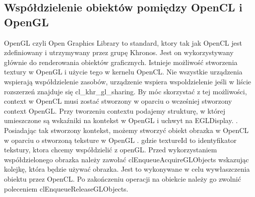 \subsection [Współdzielenie obiektów pomiędzy OpenCL i OpenGL]{Współdzielenie obiektów pomiędzy OpenCL i OpenGL}
OpenGL czyli Open Graphics Library to standard, ktory tak jak OpenCL jest zdefiniowany i utrzymywany przez grupę Khronos. Jest on wykorzystywany głównie do renderowania obiektów graficznych.
Istnieje możliwość stworzenia textury w OpenGL i użycie tego w kernelu OpenCL. Nie wszystkie urządzenia wspierają współdzielenie zasobów, urządzenie wspiera wspoldzielenie jeśli w liście rozszerzeń znajduje się cl\_khr\_gl\_sharing. By móc skorzystać z tej możliwości, context w OpenCL musi zostać stworzony w oparciu o wcześniej stworzony context OpenGL. Przy tworzeniu contextu podajemy strukturę, w której umieszczone są wskaźniki na kontekst w OpenGL i uchwyt na EGLDisplay. 
 .
 Posiadając tak stworzony kontekst, możemy stworzyć obiekt obrazka w OpenCL w oparciu o stworzoną teksture w OpenGL
 . gdzie textureId to identyfikator tekstury, ktora chcemy współdzielić z openGL. 
 Przed wykorzystaniem współdzielonego obrazka należy zawołać clEnqueueAcquireGLObjects wskazując kolejkę, która będzie używać obrazka. Jest to wykonywane w celu wywłaszczenia obiektu przez OpenCL. Po zakończeniu operacji na obiekcie należy go zwolnić poleceniem clEnqueueReleaseGLObjects.
